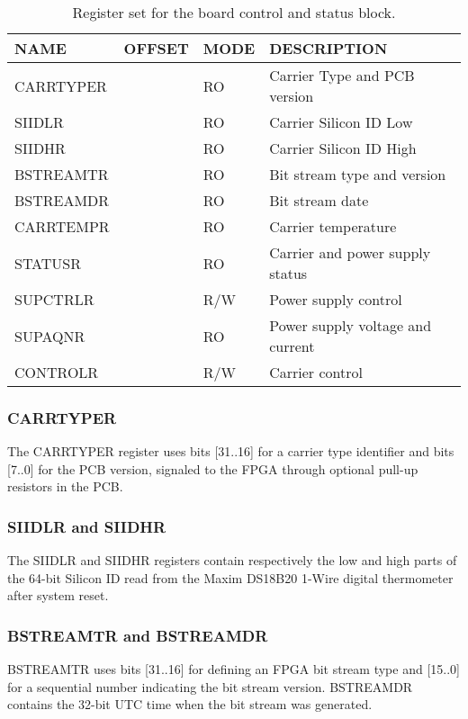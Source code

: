 \documentclass{article}
\begin{document}
\begin{table}[htbp]
  \centering
  \begin{tabularx}{\textwidth}{|l|r|l|X|}
    \hline
    \textbf{NAME} & \textbf{OFFSET} & \textbf{MODE} & \textbf{DESCRIPTION} \\
    \hline
    \hline
    CARRTYPER & & RO & Carrier Type and PCB version\\
    \hline
    SIIDLR & & RO & Carrier Silicon ID Low \\
    \hline
    SIIDHR & & RO & Carrier Silicon ID High \\
    \hline
    BSTREAMTR & & RO & Bit stream type and version \\
    \hline
    BSTREAMDR & & RO & Bit stream date \\
    \hline
    CARRTEMPR & & RO & Carrier temperature \\
    \hline
    STATUSR & & RO & Carrier and power supply status \\
    \hline
    SUPCTRLR & & R/W & Power supply control \\
    \hline
    SUPAQNR & & RO & Power supply voltage and current \\
    \hline
    CONTROLR & & R/W & Carrier control \\
    \hline
  \end{tabularx}
  \caption{Register set for the board control and status block.}
  \label{tab:stat_control}
\end{table}

\subsubsection{CARRTYPER}
The CARRTYPER register uses bits [31..16] for a carrier type identifier and bits [7..0] for the PCB version, signaled to the FPGA through optional pull-up resistors in the PCB. 

\subsubsection{SIIDLR and SIIDHR}
The SIIDLR and SIIDHR registers contain respectively the low and high parts of the 64-bit Silicon ID read from the Maxim DS18B20 1-Wire digital thermometer after system reset. 

\subsubsection{BSTREAMTR and BSTREAMDR}
BSTREAMTR uses bits [31..16] for defining an FPGA bit stream type and [15..0] for a sequential number indicating the bit stream version. BSTREAMDR contains the 32-bit UTC time when the bit stream was generated. 
\end{document}
